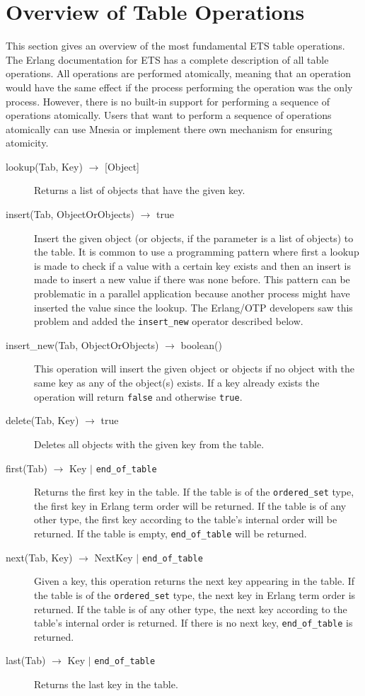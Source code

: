 \documentclass[aps,pre,preprint,nofootinbib]{revtex4}
\begin{document}
\section{Overview of Table Operations}\label{sec:table_operations}

This section gives an overview of the most fundamental ETS table operations.
The Erlang documentation for ETS has a complete description of all table operations.
All operations are performed atomically, meaning that an operation would have the same effect if the process performing the operation was the only process.
However, there is no built-in support for performing a sequence of operations atomically.
Users that want to perform a sequence of operations atomically can use Mnesia or implement there own mechanism for ensuring atomicity.

\begin{description}
\item[lookup(Tab, Key) $\rightarrow$ {[Object]}]
  Returns a list of objects that have the given key.
\item[insert(Tab, ObjectOrObjects) $\rightarrow$ true]
  Insert the given object (or objects, if the parameter is a list of objects) to the table.
  It is common to use a programming pattern where first a lookup is made to check if a value with a certain key exists and then an insert is made to insert a new value if there was none before.
  This pattern can be problematic in a parallel application because another process might have inserted the value since the lookup.
  The Erlang/OTP developers saw this problem and added the \verb|insert_new| operator described below. 
\item[insert\_new(Tab, ObjectOrObjects) $\rightarrow$ boolean()]
  This operation will insert the given object or objects if no object with the same key as any of the object(s) exists.
  If a key already exists the operation will return \verb|false| and otherwise \verb|true|.
\item[delete(Tab, Key) $\rightarrow$ true]
  Deletes all objects with the given key from the table.
\item[first(Tab) $\rightarrow$ Key $|$ \texttt{end\_of\_table}]
  Returns the first key in the table.
  If the table is of the \verb|ordered_set| type, the first key in Erlang term order will be returned.
  If the table is of any other type, the first key according to the table's internal order will be returned.
  If the table is empty, \verb|end_of_table| will be returned.
\item[next(Tab, Key) $\rightarrow$ NextKey $|$ \texttt{end\_of\_table}]
  Given a key, this operation returns the next key appearing in the table.
  If the table is of the \verb|ordered_set| type, the next key in Erlang term order is returned.
  If the table is of any other type, the next key according to the table's internal order is returned.
  If there is no next key, \texttt{end\_of\_table} is returned.
\item[last(Tab) $\rightarrow$ Key $|$ \texttt{end\_of\_table}] Returns the last key in the table.
\end{description}
\end{document}
